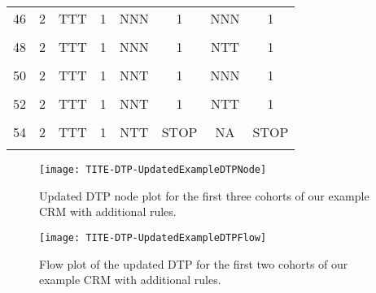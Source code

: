 \begin{table}[h!]
{\begin{tabular}[t]{cccccccc}
			46 & 2 & TTT & 1 & NNN & 1 & NNN & 1\\
			\cellcolor{gray!6}{47} & \cellcolor{gray!6}{2} & \cellcolor{gray!6}{TTT} & \cellcolor{gray!6}{1} & \cellcolor{gray!6}{NNN} & \cellcolor{gray!6}{1} & \cellcolor{gray!6}{NNT} & \cellcolor{gray!6}{1}\\
			48 & 2 & TTT & 1 & NNN & 1 & NTT & 1\\
			\cellcolor{gray!6}{49} & \cellcolor{gray!6}{2} & \cellcolor{gray!6}{TTT} & \cellcolor{gray!6}{1} & \cellcolor{gray!6}{NNN} & \cellcolor{gray!6}{1} & \cellcolor{gray!6}{TTT} & \cellcolor{gray!6}{1}\\
			50 & 2 & TTT & 1 & NNT & 1 & NNN & 1\\
			\cellcolor{gray!6}{51} & \cellcolor{gray!6}{2} & \cellcolor{gray!6}{TTT} & \cellcolor{gray!6}{1} & \cellcolor{gray!6}{NNT} & \cellcolor{gray!6}{1} & \cellcolor{gray!6}{NNT} & \cellcolor{gray!6}{1}\\
			52 & 2 & TTT & 1 & NNT & 1 & NTT & 1\\
			\cellcolor{gray!6}{53} & \cellcolor{gray!6}{2} & \cellcolor{gray!6}{TTT} & \cellcolor{gray!6}{1} & \cellcolor{gray!6}{NNT} & \cellcolor{gray!6}{1} & \cellcolor{gray!6}{TTT} & \cellcolor{gray!6}{STOP}\\
			54 & 2 & TTT & 1 & NTT & STOP & NA & STOP\\
			\cellcolor{gray!6}{55} & \cellcolor{gray!6}{2} & \cellcolor{gray!6}{TTT} & \cellcolor{gray!6}{1} & \cellcolor{gray!6}{TTT} & \cellcolor{gray!6}{STOP} & \cellcolor{gray!6}{NA} & \cellcolor{gray!6}{STOP}\\
			\bottomrule
	\end{tabular}}
\end{table}

\begin{figure}[h!]
	\centering
	\caption[Updated DTP node plot.]{Updated DTP node plot for the first three cohorts of our example CRM with additional rules.}
	\label{fig_tite-dtp:UpdatedDTPExampleNode}
	\texttt{[image: TITE-DTP-UpdatedExampleDTPNode]}
\end{figure}

\begin{figure}[h!]
	\centering
	\caption[Updated DTP flow plot.]{Flow plot of the updated DTP for the first two cohorts of our example CRM with additional rules.}
	\label{fig_tite-dtp:UpdatedDTPExampleFlow}
	\texttt{[image: TITE-DTP-UpdatedExampleDTPFlow]}
\end{figure}

